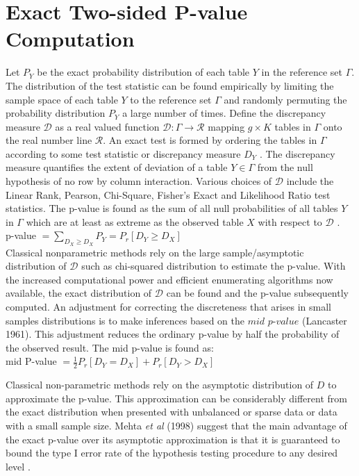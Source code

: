 \documentclass[12pt,oneside]{report}
\theoremstyle{definition}
\theoremstyle{mystyle}
\begin{document}
\section{Exact Two-sided P-value Computation}
Let $P_{Y}$ be the exact probability distribution of each table $Y$ in the reference set $\Gamma$. The distribution of the test statistic can be found empirically  by limiting the sample space of each table $Y$ to the reference set $ \Gamma$ and randomly permuting the probability distribution $P_{Y}$ a large number of times. Define the discrepancy measure $\mathcal{D}$ as a real valued function $\mathcal{D}:\Gamma \rightarrow \mathcal{R}$ mapping $g \times K$ tables in $\Gamma$ onto the real number line $\mathcal{R}$. An exact test is formed by ordering the tables in $\Gamma$ according to some test statistic or  discrepancy measure $D_{Y}$ . The discrepancy measure quantifies the extent of deviation of a table $Y \in \Gamma$ from the null hypothesis of no row by column interaction. Various choices of $\mathcal{D}$ include the Linear Rank, Pearson, Chi-Square, Fisher's Exact and  Likelihood Ratio test statistics. 
The p-value is found as the sum of all null probabilities of all  tables $Y$ in $\Gamma$ which are at least as extreme as the observed table $X$ with respect to $\mathcal{D}$ .\\
p-value $=\sum\limits_{D_{X}\geq D_{X}}P_{Y}=P_{r}[D_{Y}\geq D_{X}] $\\
Classical nonparametric methods rely on the large sample/asymptotic distribution of $\mathcal{D}$ such as chi-squared distribution to estimate the p-value. With the increased computational power and efficient enumerating algorithms now available, the exact distribution of $\mathcal{D}$ can be found and the p-value subsequently computed.
An adjustment for correcting the discreteness that arises in small samples distributions is to make inferences based on the $\textit{mid p-value}$ (Lancaster 1961). This adjustment reduces the ordinary p-value by half the probability of the observed result. The mid p-value is found as:\\
mid P-value $=\frac{1}{2}P_{r}[D_{Y}= D_{X}]+P_{r}[D_{Y}> D_{X}]$


Classical non-parametric methods rely on the asymptotic distribution of $D$ to approximate the p-value. This approximation can be considerably different from the exact distribution when presented with unbalanced or sparse data or data with a  small sample size. Mehta \textit{et al} (1998)  suggest that the main advantage of the exact p-value over its asymptotic approximation is that it is guaranteed to bound the type I error rate of the hypothesis testing procedure to any desired level \cite{mehta1}.
\end{document}
